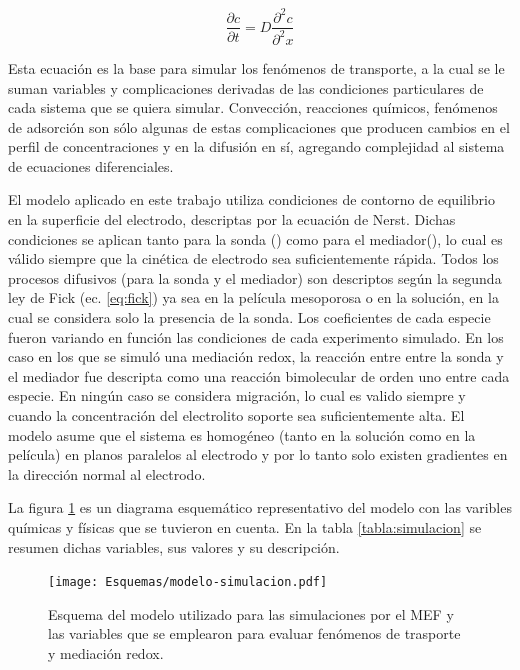 	 	 \begin{equation}
	 	 	\frac{\partial c}{\partial t}=D\frac{\partial^2 c}{\partial^2 x}
	 	 	\label{eq:fick}
	 	 \end{equation}

	 	 Esta ecuación es la base para simular los fenómenos de transporte, a la cual se le suman variables y complicaciones derivadas de las condiciones particulares de cada sistema que se quiera simular. Convección, reacciones químicos, fenómenos de adsorción son sólo algunas de estas complicaciones que producen cambios en el perfil de concentraciones y en la difusión en sí, agregando complejidad al sistema de ecuaciones diferenciales.  

	 	 El modelo aplicado en este trabajo utiliza condiciones de contorno de equilibrio en la superficie del electrodo, descriptas por la ecuación de Nerst. Dichas condiciones se aplican tanto para la sonda (\fc) como para el mediador(\ru), lo cual es válido siempre que la cinética de electrodo sea suficientemente rápida. Todos los procesos difusivos (para la sonda y el mediador) son descriptos según la segunda ley de Fick (ec. \ref{eq:fick}) ya sea en la película mesoporosa o en la solución, en la cual se considera solo la presencia de la sonda. Los coeficientes de cada especie fueron variando en función las condiciones de cada experimento simulado. En los caso en los que se simuló una mediación redox, la reacción entre entre la sonda y el mediador fue descripta como una reacción bimolecular de orden uno entre cada especie. En ningún caso se considera migración, lo cual es valido siempre y cuando la concentración del electrolito soporte sea suficientemente alta. El modelo asume que el sistema es homogéneo (tanto en la solución como en la película) en planos paralelos al electrodo y por lo tanto solo existen gradientes en la dirección normal al electrodo. 

	 	 La figura \ref{esq:simulacion} es un diagrama esquemático representativo del modelo con las varibles químicas y físicas que se tuvieron en cuenta. En la tabla \ref{tabla:simulacion} se resumen dichas variables, sus valores y su descripción.

	 			 \begin{figure}[b!]
			 		  \begin{center}
			 		  \texttt{[image: Esquemas/modelo-simulacion.pdf]}
			 		  \caption[Modelos para simulación por MEF]{Esquema del modelo utilizado para las simulaciones por el MEF y las variables que se emplearon para evaluar fenómenos de trasporte y mediación redox.}
			 		  \label{esq:simulacion}
			 		  \end{center}
			 		  \end{figure}	
	 		
